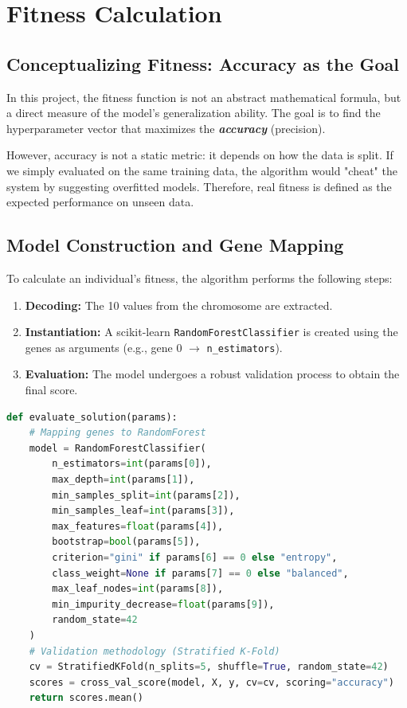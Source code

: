 \documentclass[12pt, a4paper]{article}
\begin{document}
\section{Fitness Calculation}

\subsection{Conceptualizing Fitness: Accuracy as the Goal}

In this project, the fitness function is not an abstract mathematical formula, but a
direct measure of the model's generalization ability. The goal is to find the
hyperparameter vector that maximizes the \textbf{\textit{accuracy}} (precision).

However, accuracy is not a static metric: it depends on how the data is split. If we
simply evaluated on the same training data, the algorithm would "cheat" the system by
suggesting overfitted models. Therefore, real fitness is defined as the expected
performance on unseen data.

\subsection{Model Construction and Gene Mapping}

To calculate an individual's fitness, the algorithm performs the following steps:
\begin{enumerate}[itemsep=0.2em]
  \item \textbf{Decoding:} The 10 values from the chromosome are extracted.
  \item \textbf{Instantiation:} A scikit-learn \texttt{RandomForestClassifier} is created
        using the genes as arguments (e.g., gene 0 $\to$ \texttt{n\_estimators}).
  \item \textbf{Evaluation:} The model undergoes a robust validation process to obtain
        the final score.
\end{enumerate}

\begin{lstlisting}[language=Python, caption={Fitness calculation through model evaluation}]
def evaluate_solution(params):
    # Mapping genes to RandomForest
    model = RandomForestClassifier(
        n_estimators=int(params[0]),
        max_depth=int(params[1]),
        min_samples_split=int(params[2]),
        min_samples_leaf=int(params[3]),
        max_features=float(params[4]),
        bootstrap=bool(params[5]),
        criterion="gini" if params[6] == 0 else "entropy",
        class_weight=None if params[7] == 0 else "balanced",
        max_leaf_nodes=int(params[8]),
        min_impurity_decrease=float(params[9]),
        random_state=42
    )
    # Validation methodology (Stratified K-Fold)
    cv = StratifiedKFold(n_splits=5, shuffle=True, random_state=42)
    scores = cross_val_score(model, X, y, cv=cv, scoring="accuracy")
    return scores.mean()
\end{lstlisting}
\end{document}
